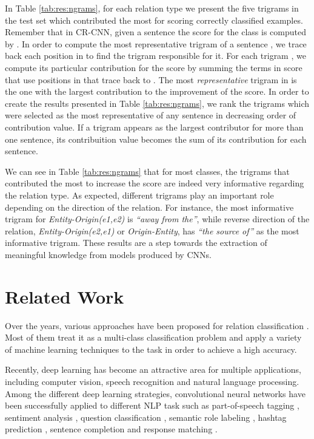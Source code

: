 \documentclass[11pt]{article}
\begin{document}
In Table \ref{tab:res:ngrams},
for each relation type we present the five trigrams in the test set which contributed the most for scoring correctly classified examples.
Remember that in CR-CNN,
given a sentence  the score for the class  is computed by .
In order to compute the most representative trigram of a sentence ,
we trace back each position in  to find the trigram responsible for it.
For each trigram ,
we compute its particular contribution for the score by summing the terms in score that use positions in  that trace back to .
The most \emph{representative} trigram in  is the one with the largest contribution to the improvement of the score.
In order to create the results presented in Table \ref{tab:res:ngrams},
we rank the trigrams which were selected as the most representative of any sentence in decreasing order of contribution value.
If a trigram appears as the largest contributor for more than one sentence, 
its contribuition value becomes the sum of its contribution for each sentence.

We can see in Table \ref{tab:res:ngrams} that for most classes,
the trigrams that contributed the most to increase the score are indeed very informative regarding the relation type.
As expected,
different trigrams play an important role depending on the direction of the relation.
For instance,
the most informative trigram for \emph{Entity-Origin(e1,e2)} is \emph{``away from the''},
while reverse direction of the relation, \emph{Entity-Origin(e2,e1)} or \emph{Origin-Entity}, has \emph{``the source of''} as the most informative trigram.
These results are a step towards the extraction of meaningful knowledge from models produced by CNNs. 
 \section{Related Work}
\label{sec:related_work}

Over the years, various approaches have been proposed for relation classification \cite{zhang2004:cikm,qian2009:SLS,hendrickx2010:semeval,rink:2010}. Most of them treat it as a multi-class classification problem and apply a variety of machine learning techniques to the task in order to achieve a high accuracy. 

Recently, 
deep learning \cite{bengio:2009} has become an attractive area for multiple applications, 
including computer vision, 
speech recognition and 
natural language processing.
Among the different deep learning strategies,
convolutional neural networks have been successfully applied to different NLP task such as part-of-speech tagging \cite{santos2014:icml},
sentiment analysis \cite{Kim@EMNLP2014,santos2014:coling},
question classification \cite{Kalchbrenner:acl2014},
semantic role labeling \cite{collobert2011:jmlr},
hashtag prediction \cite{weston:emnlp2014},
sentence completion and response matching \cite{Hu@NIPS2014}.
\end{document}
